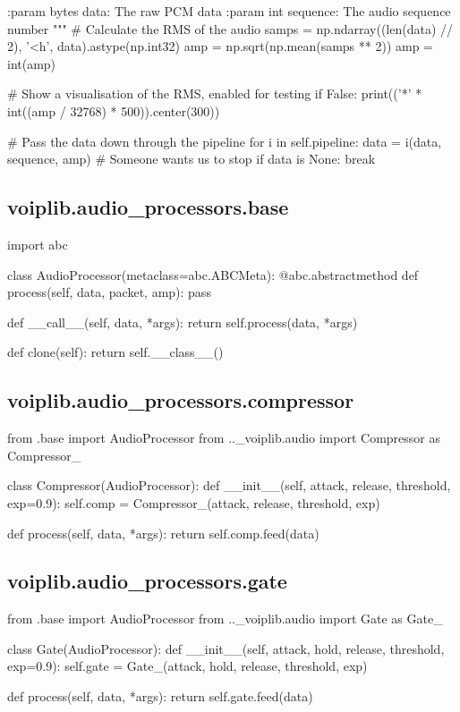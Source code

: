 \begin{pythoncode}
        :param bytes data: The raw PCM data
        :param int sequence: The audio sequence number
        """
        # Calculate the RMS of the audio
        samps = np.ndarray((len(data) // 2), '<h', data).astype(np.int32)
        amp = np.sqrt(np.mean(samps ** 2))
        amp = int(amp)

        # Show a visualisation of the RMS, enabled for testing
        if False:
            print(('*' * int((amp / 32768) * 500)).center(300))

        # Pass the data down through the pipeline
        for i in self.pipeline:
            data = i(data, sequence, amp)
            # Someone wants us to stop
            if data is None:
                break
\end{pythoncode}
\subsection{voiplib.audio\_processors.base}
\begin{pythoncode}
import abc


class AudioProcessor(metaclass=abc.ABCMeta):
    @abc.abstractmethod
    def process(self, data, packet, amp):
        pass

    def __call__(self, data, *args):
        return self.process(data, *args)

    def clone(self):
        return self.__class__()
\end{pythoncode}
\subsection{voiplib.audio\_processors.compressor}
\begin{pythoncode}
from .base import AudioProcessor
from .._voiplib.audio import Compressor as Compressor_


class Compressor(AudioProcessor):
    def __init__(self, attack, release, threshold, exp=0.9):
        self.comp = Compressor_(attack, release, threshold, exp)

    def process(self, data, *args):
        return self.comp.feed(data)
\end{pythoncode}
\subsection{voiplib.audio\_processors.gate}
\begin{pythoncode}
from .base import AudioProcessor
from .._voiplib.audio import Gate as Gate_


class Gate(AudioProcessor):
    def __init__(self, attack, hold, release, threshold, exp=0.9):
        self.gate = Gate_(attack, hold, release, threshold, exp)

    def process(self, data, *args):
        return self.gate.feed(data)
\end{pythoncode}
